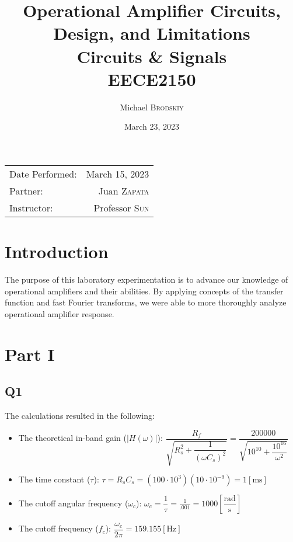\documentclass[
	letterpaper, %
	10pt, %
]{CSUniSchoolLabReport}
\title{Operational Amplifier Circuits, Design, and Limitations \\ Circuits \& Signals \\ EECE2150} %
\author{Michael \textsc{Brodskiy}}
\date{March 23, 2023} %
\begin{document}
\maketitle %

\begin{center}
	\begin{tabular}{l r}
		Date Performed: & March 15, 2023 \\ %
        Partner: & Juan \textsc{Zapata} \\ %
		Instructor: & Professor \textsc{Sun} %
	\end{tabular}
\end{center}

\setcounter{section}{-1}

\section{Introduction}

The purpose of this laboratory experimentation is to advance our knowledge of operational amplifiers and their abilities. By applying concepts of the transfer function and fast Fourier transforms, we were able to more thoroughly analyze operational amplifier response.

  \section{Part I}

  \subsection{Q1} The calculations resulted in the following:

  \vspace{5pt}

  \begin{itemize}

    \item The theoretical in-band gain ($|H(\omega)|$): $\dfrac{R_f}{\sqrt{R_s^2 + \dfrac{1}{(\omega C_s)^2}}}=\dfrac{200000}{\sqrt{10^{10}+\dfrac{10^{16}}{\omega^2}}}$

    \item The time constant ($\tau$): $\tau=R_sC_s=(100\cdot10^3)(10\cdot10^{-9})=1[\si{\milli\second}]$

    \item The cutoff angular frequency ($\omega_c$): $\omega_c=\dfrac{1}{\tau}=\frac{1}{.001}=1000\left[ \dfrac{\text{rad}}{\si{\second}} \right]$

    \item The cutoff frequency ($f_c$): $\dfrac{\omega_c}{2\pi}=159.155[\si{\hertz}]$

  \end{itemize}
\end{document}
